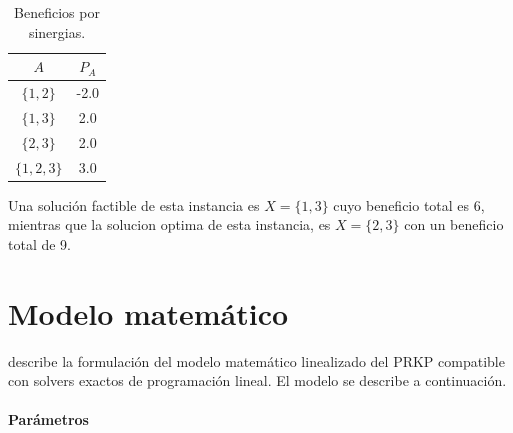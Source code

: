 \documentclass[spanish, a4paper, 12pt, openany,final]{book}
\begin{document}
	\begin{table}[H]
		\centering
		\caption{Beneficios por sinergias.}
		\label{tab:sinergias}
		\begin{tabular}{|c|c|}
			\hline
			$A$    & $P_A$\\
			\hline
			$\{1,2\}$ & -2.0 \\
			\hline
			$\{1,3\}$ & 2.0 \\
			\hline
			$\{2,3\}$ & 2.0\\
			\hline
			$\{1,2,3\}$ & 3.0\\
			\hline
		\end{tabular}
	\end{table}
	

		
	Una solución factible de esta instancia es $X = \{1,3\}$ cuyo beneficio total es 6, mientras que la solucion optima de esta instancia, es $X = \{2,3\}$ con un beneficio total de 9.
	
    
    \section{Modelo matemático}
    
    
    \cite{baldo_polynomial_2023} describe la formulación del modelo matemático linealizado del PRKP compatible con solvers exactos de programación lineal. El modelo se describe a continuación.
    
    \paragraph*{Parámetros}
    
\end{document}
